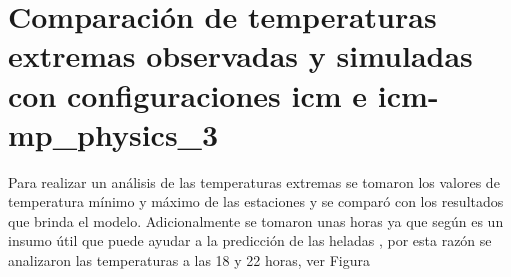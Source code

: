 


\section{Comparación de temperaturas extremas observadas y simuladas con configuraciones icm e icm-mp\_physics\_3}

Para realizar un análisis de las temperaturas extremas se tomaron los valores de temperatura mínimo y máximo de las estaciones y se comparó con los resultados que brinda el modelo. Adicionalmente se tomaron unas horas ya que según \citet{snyder2005frost} es un insumo útil que puede ayudar a la predicción de las heladas \citep{prabha2008}, por esta razón se analizaron las temperaturas a las 18 y 22 horas, ver Figura 


